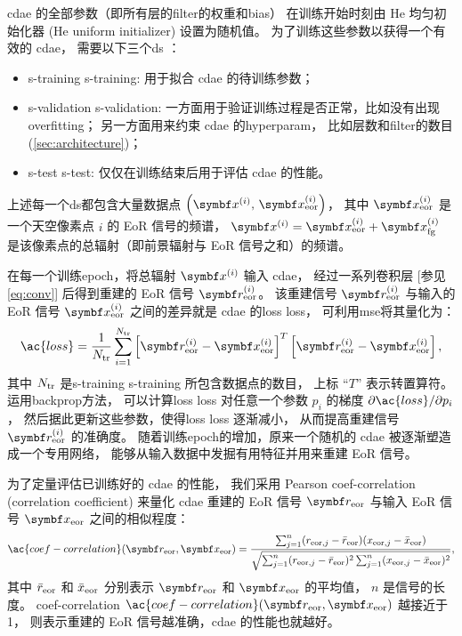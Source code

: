 \ac{cdae} 的全部参数（即所有层的\ac{filter}的权重和\ac{bias}）
在训练开始时刻由 He 均匀初始化器 (He uniform initializer)\cite{he2015}
设置为随机值。
为了训练这些参数以获得一个有效的 \ac{cdae}，
需要以下三个\ac{ds} \cite{ripley1996}：
\begin{itemize}
  \item \acl{s-training} \ac{s-training}:
    用于拟合 \ac{cdae} 的待训练参数；
  \item \acl{s-validation} \ac{s-validation}:
    一方面用于验证训练过程是否正常，比如没有出现\ac{overfitting}；
    另一方面用来约束 \ac{cdae} 的\ac{hyperparam}，
    比如层数和\ac{filter}的数目 (\autoref{sec:architecture})；
  \item \acl{s-test} \ac{s-test}:
    仅仅在训练结束后用于评估 \ac{cdae} 的性能。
\end{itemize}
上述每一个\ac{ds}都包含大量数据点
$\left( \B{x}^{(i)}, \,\B{x}^{(i)}_{\R{eor}} \right)$，
其中 $\B{x}^{(i)}_{\R{eor}}$ 是一个天空像素点 $i$ 的 EoR 信号的频谱，
$\B{x}^{(i)} = \B{x}^{(i)}_{\R{eor}} + \B{x}^{(i)}_{\R{fg}}$
是该像素点的总辐射（即前景辐射与 EoR 信号之和）的频谱。

在每一个训练\ac{epoch}，将总辐射 $\B{x}^{(i)}$ 输入 \ac{cdae}，
经过一系列卷积层 [参见\autoref{eq:conv}]
后得到重建的 EoR 信号 $\B{r}^{(i)}_{\R{eor}}$。
该重建信号 $\B{r}^{(i)}_{\R{eor}}$ 与输入的 EoR 信号 $\B{x}^{(i)}_{\R{eor}}$
之间的差异就是 \ac{cdae} 的\acl{loss} \ac{loss}，
可利用\ac{mse}将其量化为：
\begin{equation}
  \label{eq:loss}
  \ac{loss} = \frac{1}{N_{\R{tr}}} \sum_{i=1}^{N_{\R{tr}}}
    \left[ \B{r}_{\R{eor}}^{(i)} - \B{x}_{\R{eor}}^{(i)} \right]^T
    \left[ \B{r}_{\R{eor}}^{(i)} - \B{x}_{\R{eor}}^{(i)} \right] ,
\end{equation}
其中 $N_{\mathrm{tr}}$ 是\acl{s-training} \ac{s-training} 所包含数据点的数目，
上标 \enquote{$T$} 表示转置算符。
运用\ac{backprop}方法\cite{rumelhart1986,leCun1998bp}，
可以计算\acl{loss} \ac{loss} 对任意一个参数 $p_i$ 的梯度
$\partial \ac{loss} / \partial p_i$，
然后据此更新这些参数，使得\acl{loss} \ac{loss} 逐渐减小，
从而提高重建信号 $\B{r}^{(i)}_{\R{eor}}$ 的准确度。
随着训练\ac{epoch}的增加，原来一个随机的 \ac{cdae} 被逐渐塑造成一个专用网络，
能够从输入数据中发掘有用特征并用来重建 EoR 信号。

为了定量评估已训练好的 \ac{cdae} 的性能，
我们采用 Pearson \acl{coef-correlation} (correlation coefficient)
\cite{harker2009,chapman2013}
来量化 \ac{cdae} 重建的 EoR 信号 $\B{r}_{\R{eor}}$ 与输入 EoR 信号
$\B{x}_{\R{eor}}$ 之间的相似程度：
\begin{equation}
  \label{eq:corrcoef}
  \ac{coef-correlation}(\B{r}_{\R{eor}}, \B{x}_{\R{eor}})
      = \frac{\sum_{j=1}^{n}(r_{\R{eor},j} - \bar{r}_{\R{eor}})
            (x_{\R{eor},j} - \bar{x}_{\R{eor}})}{
          \sqrt{\sum_{j=1}^{n}(r_{\R{eor},j} - \bar{r}_{\R{eor}})^2
            \sum_{j=1}^{n}(x_{\R{eor},j} - \bar{x}_{\R{eor}})^2}
        } ,
\end{equation}
其中
$\bar{r}_{\mathrm{eor}}$ 和 $\bar{x}_{\mathrm{eor}}$ 分别表示
$\B{r}_{\R{eor}}$ 和 $\B{x}_{\R{eor}}$ 的平均值，
$n$ 是信号的长度。
\acl{coef-correlation}
$\ac{coef-correlation}(\B{r}_{\R{eor}}, \B{x}_{\R{eor}})$ 越接近于 1，
则表示重建的 EoR 信号越准确，\ac{cdae} 的性能也就越好。


